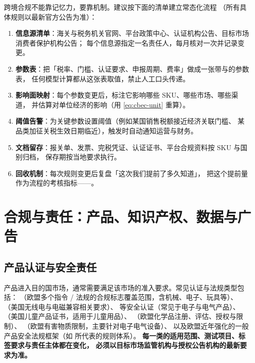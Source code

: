\begin{toolbox}
跨境合规不能靠记忆力，要靠机制。建议按下面的清单建立常态化流程
（所有具体规则以最新官方公告为准）：
\begin{enumerate}
  \item \textbf{信息源清单}：海关与税务机关官网、平台政策中心、认证机构公告、目标市场消费者保护机构公告；
        每个信息源指定一名责任人，每月核对一次并记录变更。
  \item \textbf{参数表}：把「税率、门槛、认证要求、申报周期、费率」做成一张带与的参数表，
        任何模型计算都从这张表取值，禁止人工口头传递。
  \item \textbf{影响面映射}：每个参数变更后，标注它影响哪些 SKU、哪些市场、哪些渠道，
        并估算对单位经济的影响（用 \cref{eq:cbec-unit} 重算）。
  \item \textbf{阈值告警}：为关键参数设置阈值（例如某国销售税额接近经济关联门槛、
        某品类加征关税生效日期临近），触发时自动通知运营与财务。
  \item \textbf{文档留存}：报关单、发票、完税凭证、认证证书、平台合规资料按 SKU 与国别归档，
        保存期按当地要求执行。
  \item \textbf{回收机制}：每次规则变更后复盘「这次我们提前了多久知道」，
        把这个提前量作为流程的考核指标——。
\end{enumerate}
\end{toolbox}

\section{合规与责任：产品、知识产权、数据与广告}
\label{sec:cbec-compliance}

\subsection{产品认证与安全责任}

产品进入目的国市场，通常需要满足该市场的准入要求。常见认证与法规类型包括：
（欧盟多个指令 / 法规的合规标志覆盖范围，含机械、电子、玩具等）、
（美国无线电与电磁兼容相关要求）、
 等安全认证（常见于电子与电气产品）、
（美国儿童产品证书，适用于儿童用品）、
（欧盟化学品注册、评估、授权与限制）、
（欧盟有害物质限制，主要针对电子电气设备）、
以及欧盟近年强化的一般产品安全法规框架（如  所代表的规则体系）。
\textbf{每一类的适用范围、测试项目、标签要求与责任主体都在变化，
必须以目标市场监管机构与授权公告机构的最新要求为准。}

